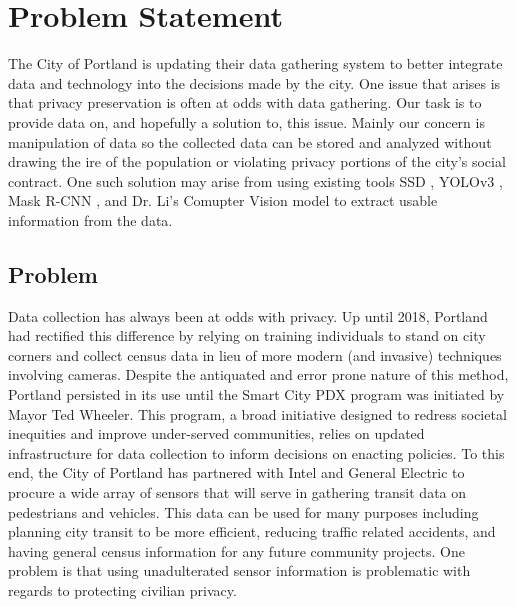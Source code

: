 
\chapter{Problem Statement}

The City of Portland is updating their data gathering system to better integrate data and technology into the decisions made by the city. One issue that arises is that privacy preservation is often at odds with data gathering. Our task is to provide data on, and hopefully a solution to, this issue. Mainly our concern is manipulation of data so the collected data can be stored and analyzed without drawing the ire of the population or violating privacy portions of the 
city's social contract. One such solution may arise from using existing 
tools SSD \cite{SSD}, YOLOv3 \cite{YOLOv3}, Mask R-CNN \cite{maskrcnn}, and Dr. Li's Comupter Vision model \cite{limodel} to extract usable information from the data.

\section{Problem}

Data collection has always been at odds with privacy. Up until 2018, Portland had rectified this difference by relying on training individuals to stand on city corners and collect census data in lieu of more modern (and invasive) techniques involving cameras. Despite the antiquated and error prone nature of this method, Portland persisted in its use until the Smart City PDX program was initiated by Mayor Ted Wheeler. This program, a broad initiative designed to redress societal inequities and improve under-served communities, relies on updated infrastructure for data collection to inform decisions on enacting policies. To this end, the City of Portland has partnered with Intel and General Electric to procure a wide array of sensors that will serve in gathering transit data on pedestrians and vehicles. This data can be used for many purposes including planning city transit to be more efficient, reducing traffic related accidents, and having general census information for any future community projects. One problem is that using unadulterated sensor information is problematic with regards to protecting civilian privacy.


